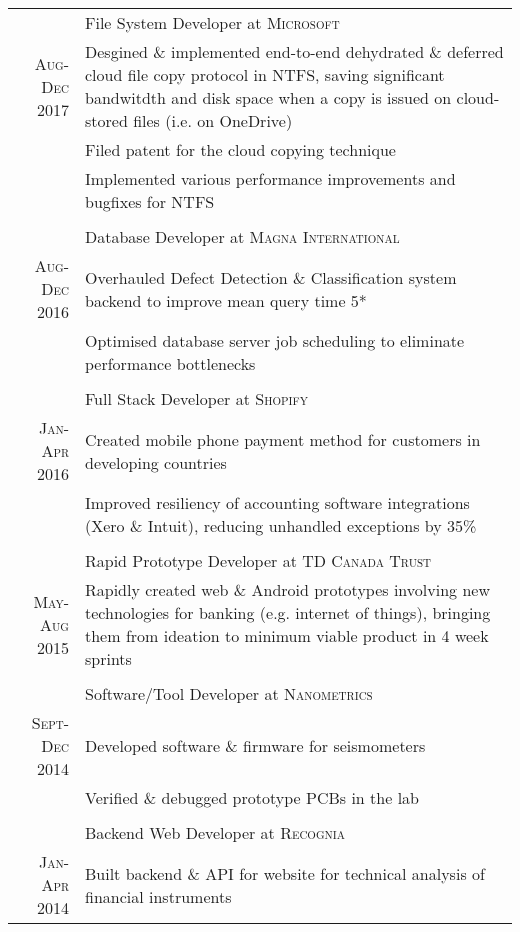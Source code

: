 \documentclass[a4paper,10pt]{article}
\begin{document}
\begin{tabular}{r|p{15.4cm}}
& File System Developer at \textsc{Microsoft} \\ \textsc{Aug-Dec 2017}
&\footnotesize{Desgined \& implemented end-to-end dehydrated \& deferred cloud file copy protocol in NTFS, saving significant bandwitdth and disk space when a copy is issued on cloud-stored files (i.e. on OneDrive)}\\
&\footnotesize{Filed patent for the cloud copying technique}\\
&\footnotesize{Implemented various performance improvements and bugfixes for NTFS}\\

\multicolumn{2}{c}{} \\
& Database Developer at \textsc{Magna International} \\ \textsc{Aug-Dec 2016}
&\footnotesize{Overhauled Defect Detection \& Classification system backend to improve mean query time 5*}\\
&\footnotesize{Optimised database server job scheduling to eliminate performance bottlenecks}\\

\multicolumn{2}{c}{} \\
& Full Stack Developer at \textsc{Shopify} \\
\textsc{Jan-Apr 2016}
&\footnotesize{Created mobile phone payment method for customers in developing countries}\\
&\footnotesize{Improved resiliency of accounting software integrations (Xero \& Intuit), reducing unhandled exceptions by 35\%}\\

\multicolumn{2}{c}{} \\
& Rapid Prototype Developer at \textsc{TD Canada Trust}\\
\textsc{May-Aug 2015}
&\footnotesize{Rapidly created web \& Android prototypes involving new technologies for banking (e.g. internet of things), bringing them from ideation to minimum viable product in 4 week sprints}\\

\multicolumn{2}{c}{}\\
& Software/Tool Developer at \textsc{Nanometrics} \\
\textsc{Sept-Dec 2014}
&\footnotesize{Developed software \& firmware for seismometers}\\
&\footnotesize{Verified \& debugged prototype PCBs in the lab}\\

\multicolumn{2}{c}{} \\
& Backend Web Developer at \textsc{Recognia} \\
\textsc{Jan-Apr 2014}
& \footnotesize{Built backend \& API for website for technical analysis of financial instruments}
\end{tabular}
\end{document}
